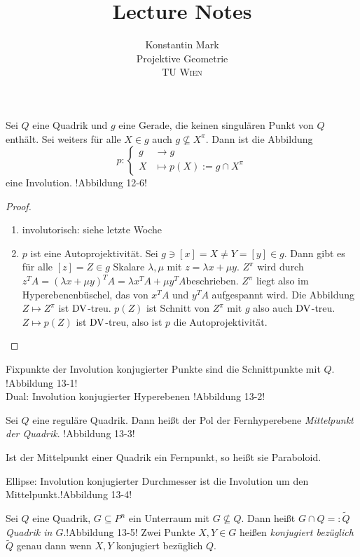 \documentclass[11pt]{article}
\title{Lecture Notes}
\author{Konstantin Mark\\
Projektive Geometrie\\ 
\textsc{TU Wien}
}
\begin{document}
\maketitle


\begin{theorem}
Sei $Q$ eine Quadrik und $g$ eine Gerade, die keinen singulären Punkt von $Q$ enthält. Sei weiters für alle $X\in g$ auch $g\not\subseteq X^\pi$. Dann ist die Abbildung \begin{equation*}
    p: \begin{cases}g&\to g\\ X&\mapsto p(X):= g\cap X^\pi\end{cases}
\end{equation*}
eine Involution. !Abbildung 12-6!
\end{theorem}
\begin{proof}
\begin{enumerate}
    \item involutorisch: siehe letzte Woche
    \item $p$ ist eine Autoprojektivität. Sei $g\ni[x] = X\neq Y = [y]\in g$. Dann gibt es für alle $[z]=Z\in g$ Skalare $\lambda, \mu$ mit $z= \lambda x + \mu y$. $Z^\pi$ wird durch $z^TA = (\lambda x + \mu y)^TA = \lambda x^T A + \mu y^T A$beschrieben. $Z^\pi$  liegt also im Hyperebenenbüschel, das von $x^TA$ und $y^TA$ aufgespannt wird. Die Abbildung $Z\mapsto Z^\pi$ ist $\mathrm{DV}$-treu. $p(Z)$ ist Schnitt von $Z^\pi$ mit $g$ also auch $\mathrm{DV}$-treu. $Z\mapsto p(Z)$ ist $\mathrm{DV}$-treu, also ist $p$ die Autoprojektivität.
\end{enumerate}
\end{proof}
\begin{remark}
Fixpunkte der Involution konjugierter Punkte sind die Schnittpunkte mit $Q$. !Abbildung 13-1!\\
Dual: Involution konjugierter Hyperebenen !Abbildung 13-2!
\end{remark}

\begin{definition}
Sei $Q$ eine reguläre Quadrik. Dann heißt der Pol der Fernhyperebene \textit{Mittelpunkt der Quadrik}. !Abbildung 13-3!
\end{definition}
\begin{definition}
Ist der Mittelpunkt einer Quadrik ein Fernpunkt, so heißt sie Paraboloid.
\end{definition}
\begin{example}
Ellipse: Involution konjugierter Durchmesser ist die Involution um den Mittelpunkt.!Abbildung 13-4!
\end{example}
\begin{definition}
Sei $Q$ eine Quadrik, $G\subseteq P^n$ ein Unterraum mit $G\not\subseteq Q$. Dann heißt $G\cap Q=:\tilde Q$ \textit{Quadrik in $G$}.!Abbildung 13-5! Zwei Punkte $X,Y\in G$ heißen \textit{konjugiert bezüglich $\tilde Q$} genau dann wenn $X,Y$ konjugiert bezüglich $Q$.
\end{definition}
\end{document}
